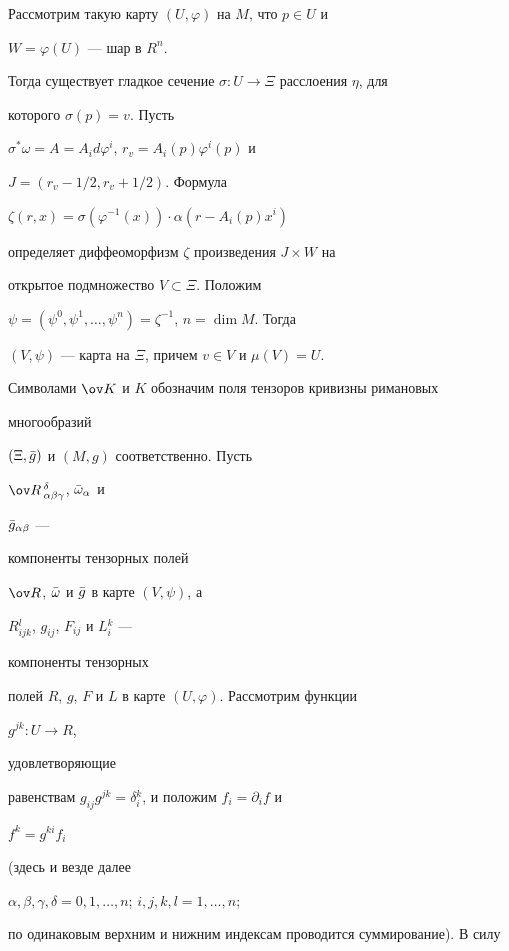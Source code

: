 \begin{pf} Рассмотрим такую карту $(U,\varphi)$ на $M$, что $p\in U$ и 


$W=\varphi(U)$ --- шар в $R^n$. 


Тогда существует гладкое сечение $\sigma:U\to\Xi$ расслоения $\eta$, для 


которого $\sigma(p)=v$. Пусть 


$\sigma^*\omega=A=A_id\varphi^i$, $r_v=A_i(p)\varphi^i(p)$ и 


$J=(r_v-1/2,r_v+1/2)$. Формула 


$\zeta(r,x)=\sigma(\varphi^{-1}(x))\cdot\alpha(r-A_i(p)x^i)$ 


определяет диффеоморфизм $\zeta$ произведения $J\times W$ на 


открытое подмножество $V\subset\Xi$. Положим 


$\psi=(\psi^0,\psi^1,\dotsc,\psi^n)=\zeta^{-1}$, $n=\dim M$. Тогда 


$(V,\psi)$ --- карта на $\Xi$, причем $v\in V$ и $\mu(V)=U$. 


 


Символами $\ov K$ и $K$ обозначим поля тензоров кривизны римановых 


многообразий 


$(\Xi,\Bar g)$ и $(M,g)$ соответственно. Пусть 


$\ov R\,{}^\delta_{\alpha\beta\gamma}$, $\Bar\omega_\alpha$ и 


$\Bar g_{\alpha\beta}$ --- 


компоненты тензорных полей 


$\ov R$, $\Bar\omega$ и $\Bar g$ в карте $(V,\psi)$, а 


$R{}^l_{ijk}$, $g_{ij}$, $F_{ij}$ и $L{}^k_i$ --- 


компоненты тензорных 


полей $R$, $g$, $F$ и $L$ в карте $(U,\varphi)$. Рассмотрим функции 


$g^{jk}:U\to R$, 


удовлетворяющие 


равенствам $g_{ij}g^{jk}=\delta{}^k_i$, и положим $f_i=\partial_i f$ и 


$f^k=g^{ki}f_i$ 


(здесь и везде далее 


$\alpha,\beta,\gamma,\delta=0,1,\dotsc,n$; $i,j,k,l=1,\dotsc,n$; 


по одинаковым верхним и нижним индексам проводится суммирование). В силу 



\end{pf}
